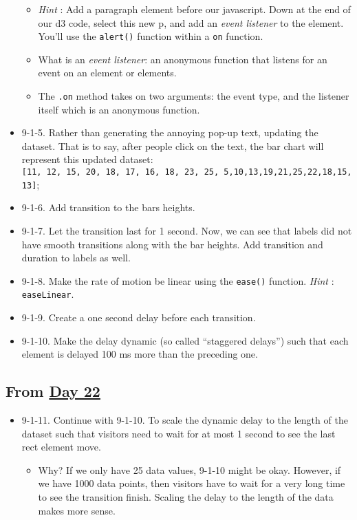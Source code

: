 \documentclass[
]{book}
\providecommand{\tightlist}{%
  \setlength{\itemsep}{0pt}\setlength{\parskip}{0pt}}
\begin{document}
\begin{itemize}
  \begin{itemize}
  \item
    \emph{Hint} : Add a paragraph element before our javascript. Down at the end of our d3 code, select this new p, and add an \emph{event listener} to the element. You'll use the \texttt{alert()} function within a \texttt{on} function.
  \item
    What is an \emph{event listener}: an anonymous function that listens for an event on an element or elements.
  \item
    The \texttt{.on} method takes on two arguments: the event type, and the listener itself which is an anonymous function.
  \end{itemize}
\item
  9-1-5. Rather than generating the annoying pop-up text, updating the dataset. That is to say, after people click on the text, the bar chart will represent this updated dataset: \texttt{{[}11,\ 12,\ 15,\ 20,\ 18,\ 17,\ 16,\ 18,\ 23,\ 25,\ 5,10,13,19,21,25,22,18,15,13{]}};
\item
  9-1-6. Add transition to the bars heights.
\item
  9-1-7. Let the transition last for 1 second. Now, we can see that labels did not have smooth transitions along with the bar heights. Add transition and duration to labels as well.
\item
  9-1-8. Make the rate of motion be linear using the \texttt{ease()} function. \emph{Hint} : \texttt{easeLinear}.
\item
  9-1-9. Create a one second delay before each transition.
\item
  9-1-10. Make the delay dynamic (so called ``staggered delays'') such that each element is delayed 100 ms more than the preceding one.
\end{itemize}

\hypertarget{from-day-22-1}{%
\subsection{\texorpdfstring{From \href{https://observablehq.com/@hongtaoh/day-twenty-two-spet-15th-2020}{Day 22}}{From Day 22}}\label{from-day-22-1}}

\begin{itemize}
\item
  9-1-11. Continue with 9-1-10. To scale the dynamic delay to the length of the dataset such that visitors need to wait for at most 1 second to see the last rect element move.

  \begin{itemize}
  \tightlist
  \item
    Why? If we only have 25 data values, 9-1-10 might be okay. However, if we have 1000 data points, then visitors have to wait for a very long time to see the transition finish. Scaling the delay to the length of the data makes more sense.
  \end{itemize}
\end{itemize}
\end{document}
